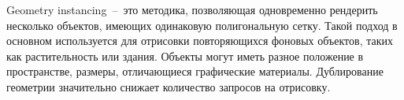 \begin{itemize}
{        Geometry instancing~--~это методика, позволяющая
        одновременно рендерить нес\-колько объектов, имеющих
        одинаковую полигональную сетку.
        Такой подход в основном используется для отрисовки
        повторяющихся фоновых объектов, таких как растительность или здания.
        Объекты могут иметь разное положение в пространстве,
        размеры, отличающиеся графические материалы.
        Дублирование геометрии значительно снижает
        количество запросов на отрисовку.
    }
\end{itemize}
